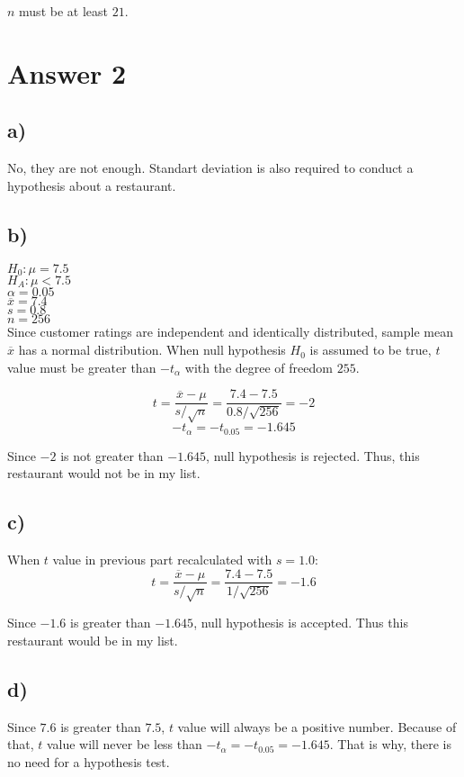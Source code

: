 \documentclass[12pt]{article}
\begin{document}
$n$ must be at least $21$.

\section*{Answer 2}
\subsection*{a)}
No, they are not enough. Standart deviation is also required to conduct a hypothesis about a restaurant.

\subsection*{b)}
$H_0: \mu = 7.5$\\
$H_A: \mu < 7.5$\\
$\alpha = 0.05$\\
$\overline{x} = 7.4$\\
$s= 0.8$\\
$n = 256$\\

Since customer ratings are independent and identically distributed, sample mean $\overline{x}$ has a normal distribution. When null hypothesis $H_0$ is assumed to be true, $t$ value must be greater than $-t_{\alpha}$ with the degree of freedom $255$.

\begin{equation*}
	t = \frac{\overline{x} - \mu}{s / \sqrt{n}} = \frac{7.4 - 7.5}{0.8 / \sqrt{256}} = -2
\end{equation*}
\begin{equation*}
	-t_{\alpha} = -t_{0.05} = -1.645
\end{equation*}

Since $-2$ is not greater than $-1.645$, null hypothesis is rejected. Thus, this restaurant would not be in my list.
\subsection*{c)}
When $t$ value in previous part recalculated with $s= 1.0$:
\begin{equation*}
	t = \frac{\overline{x} - \mu}{s / \sqrt{n}} = \frac{7.4 - 7.5}{1 / \sqrt{256}} = -1.6
\end{equation*}

Since $-1.6$ is greater than $-1.645$, null hypothesis is accepted. Thus this restaurant would be in my list.
\subsection*{d)}
Since $7.6$ is greater than $7.5$, $t$ value will always be a positive number. Because of that, $t$ value will never be less than $-t_{\alpha} = -t_{0.05} = -1.645$. That is why, there is no need for a hypothesis test.
\end{document}
